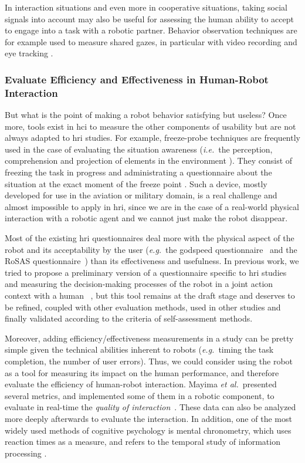 \documentclass[a4paper,11pt,twoside]{StyleThese}
\begin{document}
In interaction situations and even more in cooperative situations, taking social signals into account may also be useful for assessing the human ability to accept to engage into a task with a robotic partner. Behavior observation techniques are for example used to measure shared gazes, in particular with video recording and eye tracking \cite{gharbi2015toward}.

\subsubsection{Evaluate Efficiency and Effectiveness in Human-Robot Interaction}
But what is the point of making a robot behavior satisfying but useless? 
Once more, tools exist in \acrshort{hci} to measure the other components of usability but are not always adapted to \acrshort{hri} studies. For example, freeze-probe techniques are frequently used in the case of evaluating the situation awareness (\textit{i.e.}~the perception, comprehension and projection of elements in the environment \cite{endsley_design_1988}). They consist of freezing the task in progress and administrating a questionnaire about the situation at the exact moment of the freeze point \cite{salmon2006situation}. Such a device, mostly developed for use in the aviation or military domain, is a real challenge and almost impossible to apply in \acrshort{hri}, since we are in the case of a real-world physical interaction with a robotic agent and we cannot just make the robot disappear.

Most of the existing \acrshort{hri} questionnaires deal more with the physical aspect of the robot and its acceptability by the user (\textit{e.g.}~the godspeed questionnaire~\cite{bartneck2009measurement} and the RoSAS questionnaire~\cite{carpinella2017robotic}) than its effectiveness and usefulness.
In previous work, we tried to propose a preliminary version of a questionnaire specific to \acrshort{hri} studies and measuring the decision-making processes of the robot in a joint action context with a human~ \cite{devin_evaluating_2018}, but this tool remains at the draft stage and deserves to be refined, coupled with other evaluation methods, used in other studies and finally validated according to the criteria of self-assessment methods.

Moreover, adding efficiency/effectiveness measurements in a study can be pretty simple given the technical abilities inherent to robots (\textit{e.g.}~timing the task completion, the number of user errors). Thus, we could consider using the robot as a tool for measuring its impact on the human performance, and therefore evaluate the efficiency of human-robot interaction. Mayima \textit{et al.}~presented several metrics, and implemented some of them in a robotic component, to evaluate in real-time the \textit{quality of interaction}~\cite{mayima2020toward}. These data can also be analyzed more deeply afterwards to evaluate the interaction. In addition, one of the most widely used methods of cognitive psychology is mental chronometry, which uses reaction times as a measure, and refers to the temporal study of information processing \cite{posner1978chronometric}.
\end{document}
